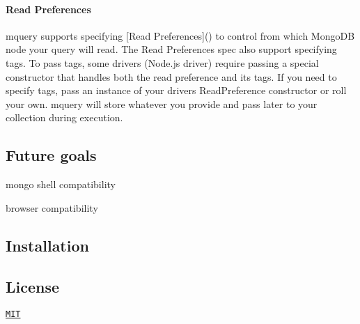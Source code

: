 \paragraph*{Read Preferences}

{\ttfamily mquery} supports specifying \mbox{[}Read Preferences\mbox{]}() to control from which Mongo\+DB node your query will read. The Read Preferences spec also support specifying tags. To pass tags, some drivers (Node.\+js driver) require passing a special constructor that handles both the read preference and its tags. If you need to specify tags, pass an instance of your drivers Read\+Preference constructor or roll your own. {\ttfamily mquery} will store whatever you provide and pass later to your collection during execution.

\subsection*{Future goals}


\begin{DoxyItemize}
\item mongo shell compatibility
\item browser compatibility
\end{DoxyItemize}

\subsection*{Installation}



\subsection*{License}

\href{https://github.com/aheckmann/mquery/blob/master/LICENSE}{\tt M\+IT} 